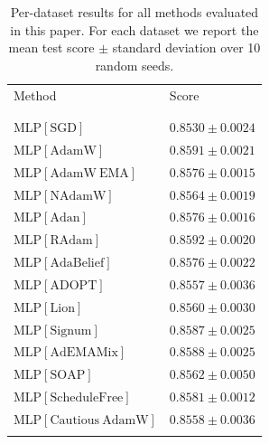 \newcommand{\topalign}[1]{%
\vtop{\vskip 0pt #1}}

\begin{longtable}{p{}p{}}
\caption{
Per-dataset results for all methods evaluated in this paper. For each dataset we report the mean test score $\pm$ standard deviation over 10 random seeds.
}
\label{tab:appendix-all-results}\\

\topalign{
\centering
\setlength\tabcolsep{2.5pt}
\renewcommand{\arraystretch}{0.8}
\begin{tabular}{ll}

\multicolumn{2}{c}{\small{Churn \textuparrow}} \\
\toprule
{\small Method} & {\small Score} \\
\midrule\\[-0.7cm]
\multicolumn{2}{c}{} \\[0.05cm]
{\footnotesize $\mathrm{MLP[SGD]}$ } & {\footnotesize$0.8530 \pm 0.0024$}\\ 
{\footnotesize $\mathrm{MLP[AdamW]}$ } & {\footnotesize$0.8591 \pm 0.0021$}\\ 
{\footnotesize $\mathrm{MLP[AdamW\ EMA]}$ } & {\footnotesize$0.8576 \pm 0.0015$}\\ 
{\footnotesize $\mathrm{MLP[NAdamW]}$ } & {\footnotesize$0.8564 \pm 0.0019$}\\ 
{\footnotesize $\mathrm{MLP[Adan]}$ } & {\footnotesize$0.8576 \pm 0.0016$}\\ 
{\footnotesize $\mathrm{MLP[RAdam]}$ } & {\footnotesize$0.8592 \pm 0.0020$}\\ 
{\footnotesize $\mathrm{MLP[AdaBelief]}$ } & {\footnotesize$0.8576 \pm 0.0022$}\\ 
{\footnotesize $\mathrm{MLP[ADOPT]}$ } & {\footnotesize$0.8557 \pm 0.0036$}\\ 
{\footnotesize $\mathrm{MLP[Lion]}$ } & {\footnotesize$0.8560 \pm 0.0030$}\\ 
{\footnotesize $\mathrm{MLP[Signum]}$ } & {\footnotesize$0.8587 \pm 0.0025$}\\ 
{\footnotesize $\mathrm{MLP[AdEMAMix]}$ } & {\footnotesize$0.8588 \pm 0.0025$}\\ 
{\footnotesize $\mathrm{MLP[SOAP]}$ } & {\footnotesize$0.8562 \pm 0.0050$}\\ 
{\footnotesize $\mathrm{MLP[ScheduleFree]}$ } & {\footnotesize$0.8581 \pm 0.0012$}\\ 
{\footnotesize $\mathrm{MLP[Cautious\ AdamW]}$ } & {\footnotesize$0.8558 \pm 0.0036$}\\ 

\end{tabular}}
\end{longtable}
